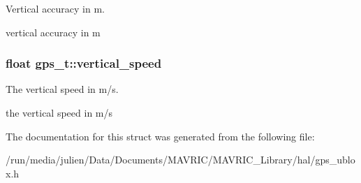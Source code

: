 Vertical accuracy in m. 

vertical accuracy in m \hypertarget{structgps__t_a106d8859fb11e943fc996c557516d9d1}{
\subsubsection[{vertical\+\_\+speed}]{\setlength{\rightskip}{0pt plus 5cm}float gps\+\_\+t\+::vertical\+\_\+speed}}\label{structgps__t_a106d8859fb11e943fc996c557516d9d1}


The vertical speed in m/s. 

the vertical speed in m/s 

The documentation for this struct was generated from the following file\+:\begin{DoxyCompactItemize}
\item 
/run/media/julien/\+Data/\+Documents/\+M\+A\+V\+R\+I\+C/\+M\+A\+V\+R\+I\+C\+\_\+\+Library/hal/gps\+\_\+ublox.\+h\end{DoxyCompactItemize}
